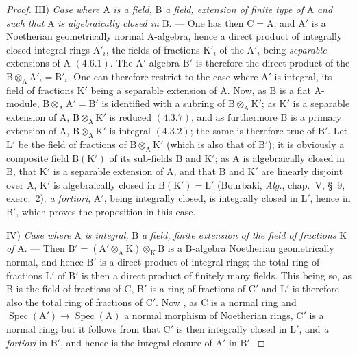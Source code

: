 \begin{proof}
III) \emph{Case where} $\mathrm{A}$ \emph{is a field,} $\mathrm{B}$ \emph{a field, extension of finite type of} $\mathrm{A}$ \emph{and such that} $\mathrm{A}$ \emph{is algebraically
closed in} $\mathrm{B}$. --- One has then $\mathrm{C}=\mathrm{A}$, and $\mathrm{A}'$ is a Noetherian geometrically
normal $\mathrm{A}$-algebra, hence a direct product of integrally closed integral rings $\mathrm{A}'_i$, the
fields of fractions $\mathrm{K}'_i$ of the $\mathrm{A}'_i$ being \emph{separable} extensions of $\mathrm{A}$ $(4.6.1)$. The $\mathrm{A}'$-algebra $\mathrm{B}'$
is therefore the direct product of the $\mathrm{B}\otimes_\mathrm{A}\mathrm{A}'_i=\mathrm{B}'_i$. One can therefore restrict to the case where $\mathrm{A}'$ is
integral, its field of fractions $\mathrm{K}'$ being a separable extension of $\mathrm{A}$. Now, as $\mathrm{B}$ is a flat $\mathrm{A}$-module,
$\mathrm{B}\otimes_\mathrm{A}\mathrm{A}'=\mathrm{B}'$ is identified with a subring of $\mathrm{B}\otimes_\mathrm{A}\mathrm{K}'$; as $\mathrm{K}'$
is a separable extension of $\mathrm{A}$, $\mathrm{B}\otimes_\mathrm{A}\mathrm{K}'$ is reduced $(4.3.7)$, and as furthermore $\mathrm{B}$ is a
primary extension of $\mathrm{A}$, $\mathrm{B}\otimes_\mathrm{A}\mathrm{K}'$ is integral $(4.3.2)$; the same is therefore true of $\mathrm{B}'$.
Let $\mathrm{L}'$ be the field of fractions of $\mathrm{B}\otimes_\mathrm{A}\mathrm{K}'$ (which is also that of $\mathrm{B}'$); it is obviously a
composite field $\mathrm{B}(\mathrm{K}')$ of its sub-fields $\mathrm{B}$ and $\mathrm{K}'$; as $\mathrm{A}$ is algebraically closed in $\mathrm{B}$,
that $\mathrm{K}'$ is a separable extension of $\mathrm{A}$, and that $\mathrm{B}$ and $\mathrm{K}'$ are linearly disjoint over $\mathrm{A}$,
$\mathrm{K}'$ is algebraically closed in $\mathrm{B}(\mathrm{K}')=\mathrm{L}'$ (Bourbaki, \emph{Alg.}, chap.~V, \S~9, exerc.~2);
\emph{a fortiori}, $\mathrm{A}'$, being integrally closed, is integrally closed in $\mathrm{L}'$, hence in $\mathrm{B}'$,
which proves the proposition in this case.

IV) \emph{Case where} $\mathrm{A}$ \emph{is integral,} $\mathrm{B}$ \emph{a field, finite extension of the field of fractions} $\mathrm{K}$ \emph{of} $\mathrm{A}$. ---
Then $\mathrm{B}'=(\mathrm{A}'\otimes_\mathrm{A}\mathrm{K})\otimes_\mathrm{K}\mathrm{B}$ is a $\mathrm{B}$-algebra Noetherian geometrically normal, and
hence $\mathrm{B}'$ is a direct product of integral rings; the total ring of fractions $\mathrm{L}'$ of $\mathrm{B}'$
is then a direct product of finitely many fields. This being so, as $\mathrm{B}$ is the field of
fractions of $\mathrm{C}$, $\mathrm{B}'$ is a ring of fractions of $\mathrm{C}'$ and $\mathrm{L}'$ is therefore also the total ring of
fractions of $\mathrm{C}'$. Now , as $\mathrm{C}$ is a normal ring and $\operatorname{Spec}(\mathrm{A}')\to\operatorname{Spec}(\mathrm{A})$
a normal morphism of Noetherian rings, $\mathrm{C}'$ is a normal ring; but it follows from
 that $\mathrm{C}'$ is then integrally closed in $\mathrm{L}'$, and \emph{a fortiori} in $\mathrm{B}'$, and hence
is the integral closure of $\mathrm{A}'$ in $\mathrm{B}'$.


\end{proof}
